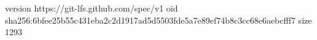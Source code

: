 version https://git-lfs.github.com/spec/v1
oid sha256:6bfee25b55c431eba2c2d1917ad5d5503fde5a7e89ef74b8c3cc68e6aebcfff7
size 1293
